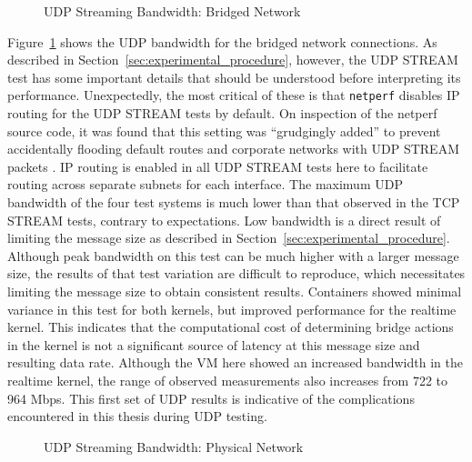 \begin{figure}
    \centering
    \def\svgwidth{\columnwidth}
    
    \caption{UDP Streaming Bandwidth: Bridged Network}
    \label{fig:udp_stream_bridge}
\end{figure}
Figure~\ref{fig:udp_stream_bridge} shows the UDP bandwidth for the bridged network connections.  
As described in Section~\ref{sec:experimental_procedure}, however, the UDP STREAM test has some important details that should be understood before interpreting its performance.
Unexpectedly, the most critical of these is that \texttt{netperf} disables IP routing for the UDP STREAM tests by default.
On inspection of the netperf source code, it was found that this setting was ``grudgingly added'' to prevent accidentally flooding default routes and corporate networks with UDP STREAM packets \autocite{netperfsource}.
IP routing is enabled in all UDP STREAM tests here to facilitate routing across separate subnets for each interface.
The maximum UDP bandwidth of the four test systems is much lower than that observed in the TCP STREAM tests, contrary to expectations.
Low bandwidth is a direct result of limiting the message size as described in Section~\ref{sec:experimental_procedure}.
Although peak bandwidth on this test can be much higher with a larger message size, the results of that test variation are difficult to reproduce, which necessitates limiting the message size to obtain consistent results.  
Containers showed minimal variance in this test for both kernels, but improved performance for the realtime kernel.  
This indicates that the computational cost of determining bridge actions in the kernel is not a significant source of latency at this message size and resulting data rate.
Although the VM here showed an increased bandwidth in the realtime kernel, the range of observed measurements also increases from 722 to 964 Mbps. 
This first set of UDP results is indicative of the complications encountered in this thesis during UDP testing.

\begin{figure}
    \centering
    \def\svgwidth{\columnwidth}
    
    \caption{UDP Streaming Bandwidth: Physical Network}
    \label{fig:udp_stream_phys}
\end{figure}

